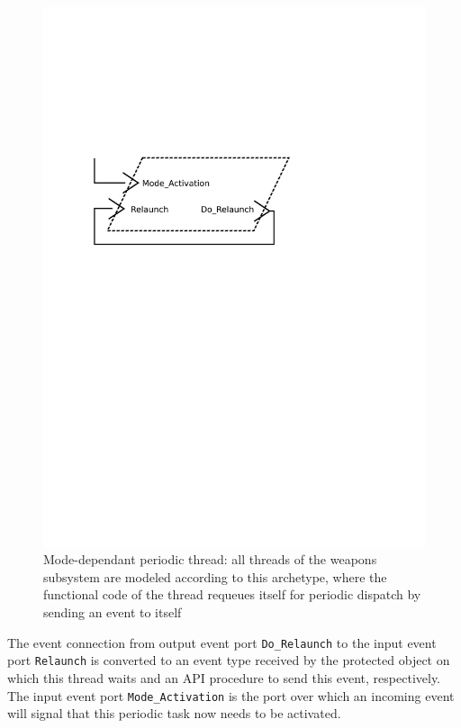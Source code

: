 \begin{figure}
\centering
\includegraphics[scale=0.5]{figs/mode_periodic}
\caption{Mode-dependant periodic thread: {\normalsize all threads of
    the weapons subsystem are modeled according to this archetype,
    where the functional code of the thread requeues itself for
    periodic dispatch by sending an event to itself}}
\label{fig:mode_periodic}
\end{figure}

The event connection from output event port \texttt{Do\_Relaunch} to
the input event port \texttt{Relaunch} is converted to an event type
received by the protected object on which this thread waits and an API
procedure to send this event, respectively. The input event port
\texttt{Mode\_Activation} is the port over which an incoming event
will signal that this periodic task now needs to be activated.

